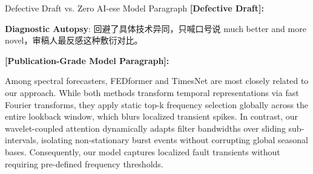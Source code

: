 \begin{ExampleBox}{Defective Draft vs. Zero AI-ese Model Paragraph}
\textbf{\color{TargetHighlight}[Defective Draft]:}\par
{}\par\vspace{4pt}
\textbf{Diagnostic Autopsy}: 回避了具体技术异同，只喊口号说 much better and more novel，审稿人最反感这种敷衍对比。\par\vspace{6pt}
\textbf{\color{AcadNavy}[Publication-Grade Model Paragraph]:}\par
Among spectral forecasters, FEDformer and TimesNet are most closely related to our approach. While both methods transform temporal representations via fast Fourier transforms, they apply static top-k frequency selection globally across the entire lookback window, which blurs localized transient spikes. In contrast, our wavelet-coupled attention dynamically adapts filter bandwidths over sliding sub-intervals, isolating non-stationary burst events without corrupting global seasonal bases. Consequently, our model captures localized fault transients without requiring pre-defined frequency thresholds.
\end{ExampleBox}
